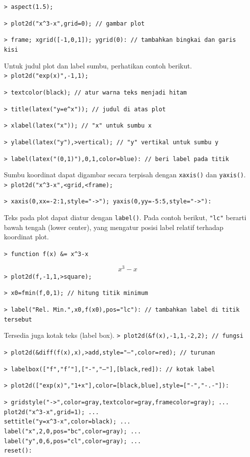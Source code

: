 \documentclass[11pt, a4paper]{article}
\newcommand{\emtcmd}[1]{\noindent\texttt{\textcolor{emtcommand}{>}\ #1}\par\smallskip}
\begin{document}
\emtcmd{aspect(1.5);}
\emtcmd{plot2d("x\^{}3-x",grid=0); \textcolor{emtcomment}{// gambar plot}}
\emtcmd{frame; xgrid([-1,0,1]); ygrid(0): \textcolor{emtcomment}{// tambahkan bingkai dan garis kisi}}

Untuk judul plot dan label sumbu, perhatikan contoh berikut.
\emtcmd{plot2d("exp(x)",-1,1);}
\emtcmd{textcolor(black); \textcolor{emtcomment}{// atur warna teks menjadi hitam}}
\emtcmd{title(latex("y=e\^{}x")); \textcolor{emtcomment}{// judul di atas plot}}
\emtcmd{xlabel(latex("x")); \textcolor{emtcomment}{// "x" untuk sumbu x}}
\emtcmd{ylabel(latex("y"),>vertical); \textcolor{emtcomment}{// "y" vertikal untuk sumbu y}}
\emtcmd{label(latex("(0,1)"),0,1,color=blue): \textcolor{emtcomment}{// beri label pada titik}}

Sumbu koordinat dapat digambar secara terpisah dengan \texttt{xaxis()} dan \texttt{yaxis()}.
\emtcmd{plot2d("x\^{}3-x",<grid,<frame);}
\emtcmd{xaxis(0,xx=-2:1,style="->"); yaxis(0,yy=-5:5,style="->"):}

Teks pada plot dapat diatur dengan \texttt{label()}. Pada contoh berikut, \texttt{"lc"} berarti bawah tengah (lower center), yang mengatur posisi label relatif terhadap koordinat plot.

\emtcmd{function f(x) \&= x\^{}3-x}
$$x^3 - x$$
\emtcmd{plot2d(f,-1,1,>square);}
\emtcmd{x0=fmin(f,0,1); \textcolor{emtcomment}{// hitung titik minimum}}
\emtcmd{label("Rel. Min.",x0,f(x0),pos="lc"): \textcolor{emtcomment}{// tambahkan label di titik tersebut}}

Tersedia juga kotak teks (label box).
\emtcmd{plot2d(\&f(x),-1,1,-2,2); \textcolor{emtcomment}{// fungsi}}
\emtcmd{plot2d(\&diff(f(x),x),>add,style="--",color=red); \textcolor{emtcomment}{// turunan}}
\emtcmd{labelbox(["f","f'"],["-","--"],[black,red]): \textcolor{emtcomment}{// kotak label}}
\emtcmd{plot2d(["exp(x)","1+x"],color=[black,blue],style=["-","-.-"]):}
\emtcmd{gridstyle("->",color=gray,textcolor=gray,framecolor=gray); ... \\
\hspace*{1em} plot2d("x\^{}3-x",grid=1); ... \\
\hspace*{1em} settitle("y=x\^{}3-x",color=black); ... \\
\hspace*{1em} label("x",2,0,pos="bc",color=gray); ... \\
\hspace*{1em} label("y",0,6,pos="cl",color=gray); ... \\
\hspace*{1em} reset():}
\end{document}
